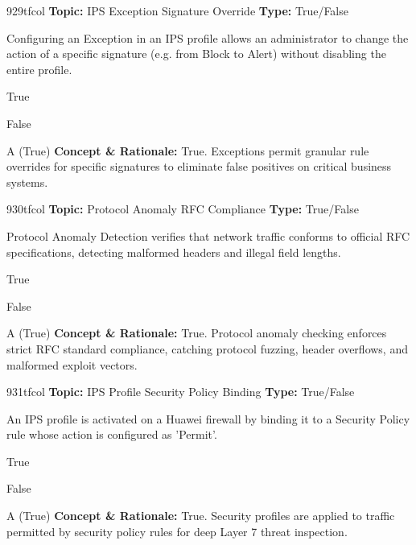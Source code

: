 \begin{qcard}{929}{tfcol}
\textcolor{darkslate!75}{\small\textbf{Topic:} IPS Exception Signature Override \hfill \textbf{Type:} True/False}\vspace{0.4em}\par
Configuring an Exception in an IPS profile allows an administrator to change the action of a specific signature (e.g. from Block to Alert) without disabling the entire profile.
\begin{qoptions}
\item True
\item False
\end{qoptions}
\end{qcard}
\nopagebreak
\begin{explainbox}{A (True)}
\textbf{Concept \& Rationale:} True. Exceptions permit granular rule overrides for specific signatures to eliminate false positives on critical business systems.
\end{explainbox}

\begin{qcard}{930}{tfcol}
\textcolor{darkslate!75}{\small\textbf{Topic:} Protocol Anomaly RFC Compliance \hfill \textbf{Type:} True/False}\vspace{0.4em}\par
Protocol Anomaly Detection verifies that network traffic conforms to official RFC specifications, detecting malformed headers and illegal field lengths.
\begin{qoptions}
\item True
\item False
\end{qoptions}
\end{qcard}
\nopagebreak
\begin{explainbox}{A (True)}
\textbf{Concept \& Rationale:} True. Protocol anomaly checking enforces strict RFC standard compliance, catching protocol fuzzing, header overflows, and malformed exploit vectors.
\end{explainbox}

\begin{qcard}{931}{tfcol}
\textcolor{darkslate!75}{\small\textbf{Topic:} IPS Profile Security Policy Binding \hfill \textbf{Type:} True/False}\vspace{0.4em}\par
An IPS profile is activated on a Huawei firewall by binding it to a Security Policy rule whose action is configured as 'Permit'.
\begin{qoptions}
\item True
\item False
\end{qoptions}
\end{qcard}
\nopagebreak
\begin{explainbox}{A (True)}
\textbf{Concept \& Rationale:} True. Security profiles are applied to traffic permitted by security policy rules for deep Layer 7 threat inspection.
\end{explainbox}

